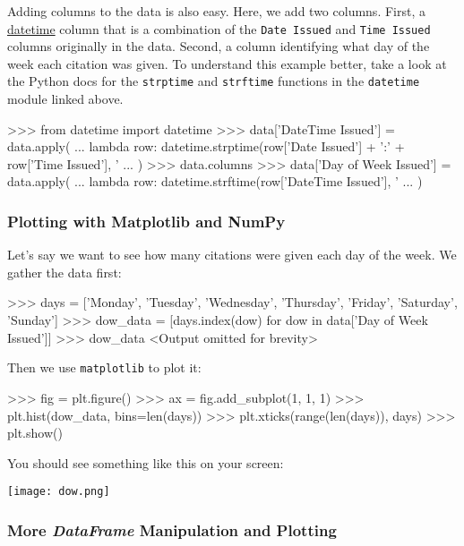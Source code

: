 Adding columns to the data is also easy. Here, we add two columns.
First, a
\href{https://docs.python.org/2/library/datetime.html}{datetime} column
that is a combination of the \texttt{Date\ Issued} and
\texttt{Time\ Issued} columns originally in the data. Second, a column
identifying what day of the week each citation was given. To understand
this example better, take a look at the Python docs for the
\texttt{strptime} and \texttt{strftime} functions in the
\texttt{datetime} module linked above.

\begin{lstlistings}
>>> from datetime import datetime
>>> data['DateTime Issued'] = data.apply(
...  lambda row: datetime.strptime(row['Date Issued'] + ':' + row['Time Issued'], '%
... )
>>> data.columns
>>> data['Day of Week Issued'] = data.apply(
...  lambda row: datetime.strftime(row['DateTime Issued'], '%
... )
\end{lstlistings}

\subsubsection{Plotting with Matplotlib and
NumPy}\label{plotting-with-matplotlib-and-numpy}

Let's say we want to see how many citations were given each day of the
week. We gather the data first:

\begin{lstlistings}
>>> days = ['Monday', 'Tuesday', 'Wednesday', 'Thursday', 'Friday', 'Saturday', 'Sunday']
>>> dow_data = [days.index(dow) for dow in data['Day of Week Issued']]
>>> dow_data
<Output omitted for brevity>
\end{lstlistings}

Then we use \texttt{matplotlib} to plot it:

\begin{lstlistings}
>>> fig = plt.figure()
>>> ax = fig.add_subplot(1, 1, 1)
>>> plt.hist(dow_data, bins=len(days))
>>> plt.xticks(range(len(days)), days)
>>> plt.show()
\end{lstlistings}

You should see something like this on your screen:

\texttt{[image: dow.png]}

\subsubsection{\texorpdfstring{More \emph{DataFrame} Manipulation and
Plotting}{More DataFrame Manipulation and Plotting}}\label{more-dataframe-manipulation-and-plotting}

